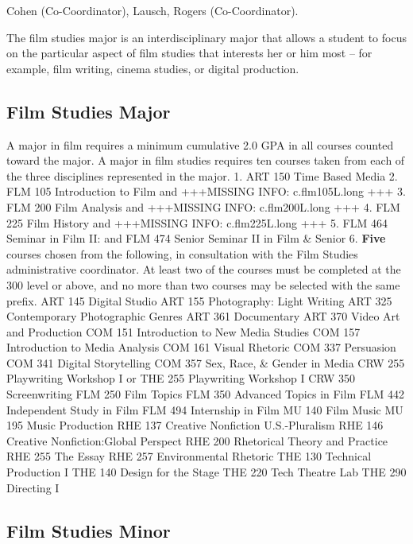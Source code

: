 \documentclass[
  letterpaper,
]{scrbook}
\begin{document}
Cohen (Co-Coordinator), Lausch, Rogers (Co-Coordinator).

The film studies major is an interdisciplinary major that allows a
student to focus on the particular aspect of film studies that interests
her or him most -- for example, film writing, cinema studies, or digital
production.

\hypertarget{film-studies-major}{%
\subsection{Film Studies Major}\label{film-studies-major}}

A major in film requires a minimum cumulative 2.0 GPA in all courses
counted toward the major. A major in film studies requires ten courses
taken from each of the three disciplines represented in the major. 1.
ART 150 Time Based Media 2. FLM 105 Introduction to Film and +++MISSING
INFO: c.flm105L.long +++ 3. FLM 200 Film Analysis and +++MISSING INFO:
c.flm200L.long +++ 4. FLM 225 Film History and +++MISSING INFO:
c.flm225L.long +++ 5. FLM 464 Seminar in Film II: and FLM 474 Senior
Seminar II in Film \& Senior 6. \textbf{Five} courses chosen from the
following, in consultation with the Film Studies administrative
coordinator. At least two of the courses must be completed at the 300
level or above, and no more than two courses may be selected with the
same prefix. ART 145 Digital Studio ART 155 Photography: Light Writing
ART 325 Contemporary Photographic Genres ART 361 Documentary ART 370
Video Art and Production COM 151 Introduction to New Media Studies COM
157 Introduction to Media Analysis COM 161 Visual Rhetoric COM 337
Persuasion COM 341 Digital Storytelling COM 357 Sex, Race, \& Gender in
Media CRW 255 Playwriting Workshop I or THE 255 Playwriting Workshop I
CRW 350 Screenwriting FLM 250 Film Topics FLM 350 Advanced Topics in
Film FLM 442 Independent Study in Film FLM 494 Internship in Film MU 140
Film Music MU 195 Music Production RHE 137 Creative Nonfiction
U.S.-Pluralism RHE 146 Creative Nonfiction:Global Perspect RHE 200
Rhetorical Theory and Practice RHE 255 The Essay RHE 257 Environmental
Rhetoric THE 130 Technical Production I THE 140 Design for the Stage THE
220 Tech Theatre Lab THE 290 Directing I

\hypertarget{film-studies-minor}{%
\subsection{Film Studies Minor}\label{film-studies-minor}}
\end{document}

